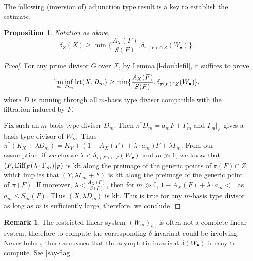 \documentclass[12pt,reqno]{amsart}%
\newtheorem{prop}[thm]{Proposition}
\theoremstyle{definition}
\newtheorem{rem}[thm]{Remark}
\theoremstyle{remark}
\newcommand{\lct}{{\rm lct}}
\begin{document}
The following (inversion of) adjunction type result is a key to establish the estimate.
\begin{prop}\label{p-kadjunction}
Notation as above, 
$$\delta_Z(X)\ge \min \{\frac{A_X(F)}{S(F)}, \delta_{\pi(F)\cap Z}(W_{\bullet}) \}.$$
\end{prop}
\begin{proof} For any prime divisor $G$ over $X$, by Lemma \ref{l-doublefil}, it suffices to prove
$$\lim_m\inf_{D_m}\lct(X,D_m)\ge \min \{\frac{A_X(F)}{S(F)}, \delta_{\pi(F)\cap Z}(W_{\bullet})\},$$
where $D$ is running through all $m$-basis type divisor compatible with the filtration induced by $F$. 

Fix such an $m$-basis type divisor $D_m$. Then $\pi^*D_m=a_mF+\Gamma_m$ and $\Gamma_m|_{F}$ gives a basis type divisor of $W_m$.
Thus $\pi^*(K_X+\lambda D_m)=K_Y+(1-A_{X}(F)+\lambda\cdot a_m)F+\lambda \Gamma_m$. From our assumption, if we choose $\lambda< \delta_{\pi(F)\cap Z}(W_{\bullet})$ and $m\gg 0$, we know that  $(F, {\rm Diff}_F(\lambda\cdot \Gamma_m)|_F)$ is klt along the preimage of the generic points of $\pi(F)\cap Z $, which implies that $(Y,\lambda\Gamma_m+F)$ is klt along the preimage of the generic point of $\pi(F)$. If moreover, $\lambda< \frac{A_X(F)}{S(F)}$, then for $m\gg 0$, $1-A_{X}(F)+\lambda\cdot a_m<1$ as $a_m\le S_m(F)$. Thus $(X,\lambda D_m)$ is klt. This is true for any $m$-basis type divisor as long as $m$ is sufficiently large, therefore, we conclude. 
\end{proof}
\begin{rem}The restricted linear system $(W_m)_{i,j}$ is often not a complete linear system, therefore to compute the corresponding $\delta$-invariant could be involving. Nevertheless, there are cases that the asymptotic invariant $\delta(W_{\bullet})$ is easy to compute. See \ref{say-flag}.
\end{rem}
\end{document}
